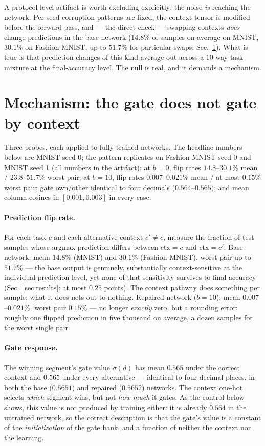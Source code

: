 \documentclass[review,12pt,number]{elsarticle}
\begin{document}
A protocol-level artifact is worth excluding explicitly: the noise
\emph{is} reaching the network. Per-seed corruption patterns are fixed,
the context tensor is modified before the forward pass, and --- the
direct check --- swapping contexts \emph{does} change predictions in the
base network ($14.8\%$ of samples on average on MNIST, $30.1\%$ on
Fashion-MNIST, up to $51.7\%$ for particular swaps;
Sec.~\ref{sec:mech}). What is true is that prediction changes of this
kind average out across a $10$-way task mixture at the final-accuracy
level. The null is real, and it demands a mechanism.



\section{Mechanism: the gate does not gate by context}
\label{sec:mech}

Three probes, each applied to fully trained networks. The headline
numbers below are MNIST seed 0; the pattern replicates on Fashion-MNIST
seed 0 and MNIST seed 1 (all numbers in the artifact): at $b{=}0$,
flip rates $14.8$--$30.1\%$ mean / $23.8$--$51.7\%$ worst pair; at
$b{=}10$, flip rates $0.007$--$0.021\%$ mean / at most $0.15\%$ worst
pair; gate own/other identical to four decimals ($0.564$--$0.565$); and
mean column cosines in $[0.001, 0.003]$ in every case.

\paragraph{Prediction flip rate.} For each task $c$ and each alternative
context $c' \ne c$, measure the fraction of test samples whose argmax
prediction differs between $\mathrm{ctx}{=}c$ and $\mathrm{ctx}{=}c'$.
Base network: mean $14.8\%$ (MNIST) and $30.1\%$ (Fashion-MNIST), worst
pair up to $51.7\%$ --- the base output is genuinely, substantially
context-sensitive at the individual-prediction level, yet none of that
sensitivity survives to final accuracy (Sec.~\ref{sec:results}: at most
$0.25$ points). The context pathway does something per sample; what it
does nets out to nothing. Repaired network ($b{=}10$): mean
$0.007$--$0.021\%$, worst pair $0.15\%$ --- no longer \emph{exactly}
zero, but a rounding error: roughly one flipped prediction in five
thousand on average, a dozen samples for the worst single pair.

\paragraph{Gate response.} The winning segment's gate value
$\sigma(d)$ has mean $0.565$ under the correct context and $0.565$
under every alternative --- identical to four decimal places, in both
the base ($0.5651$) and repaired ($0.5652$) networks. The context
one-hot selects \emph{which} segment wins, but not \emph{how much} it
gates. As the control below shows, this value is not produced by
training either: it is already $0.564$ in the untrained network, so the
correct description is that the gate's value is a constant of the
\emph{initialization} of the gate bank, and a function of neither the
context nor the learning.
\end{document}

